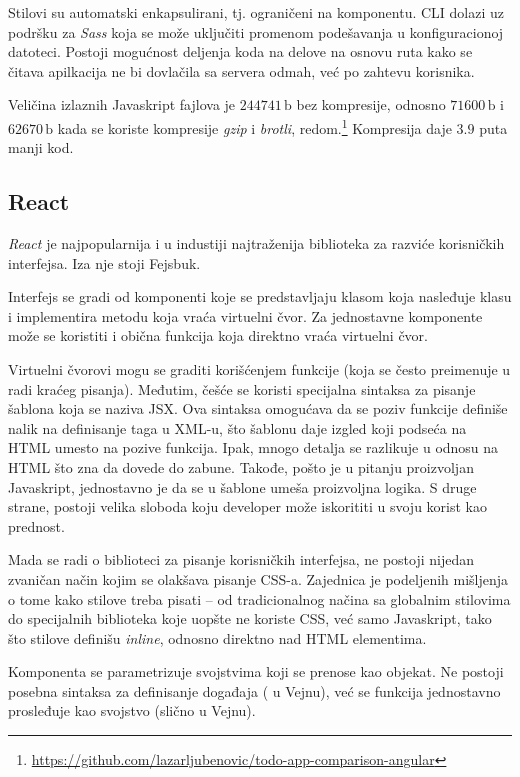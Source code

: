 Stilovi su automatski enkapsulirani, tj. ograničeni na komponentu.
CLI dolazi uz podršku za \textsl{Sass} koja se može uključiti promenom podešavanja u konfiguracionoj datoteci.
Postoji mogućnost deljenja koda na delove na osnovu ruta kako se čitava apilkacija ne bi dovlačila sa servera odmah, već po zahtevu korisnika.

Veličina izlaznih Javaskript fajlova je $244741\,\mathrm{b}$ bez kompresije, odnosno $71600\,\mathrm{b}$ i $62670\,\mathrm{b}$ kada se koriste kompresije \textsl{gzip} i \textsl{brotli}, redom.\footnote{\url{https://github.com/lazarljubenovic/todo-app-comparison-angular}} Kompresija daje $3.9$ puta manji kod.

\subsection{React}

\textsl{React} je najpopularnija i u industiji najtraženija biblioteka za razviće korisničkih interfejsa.
Iza nje stoji Fejsbuk.

Interfejs se gradi od komponenti koje se predstavljaju klasom koja nasleđuje klasu  i implementira metodu  koja vraća virtuelni čvor.
Za jednostavne komponente može se koristiti i obična funkcija koja direktno vraća virtuelni čvor.

Virtuelni čvorovi mogu se graditi korišćenjem funkcije  (koja se često preimenuje u  radi kraćeg pisanja).
Međutim, češće se koristi specijalna sintaksa za pisanje šablona koja se naziva JSX.
Ova sintaksa omogućava da se poziv funkcije definiše nalik na definisanje taga u XML-u, što šablonu daje izgled koji podseća na HTML umesto na pozive funkcija.
Ipak, mnogo detalja se razlikuje u odnosu na HTML što zna da dovede do zabune.
Takođe, pošto je u pitanju proizvoljan Javaskript, jednostavno je da se u šablone umeša proizvoljna logika.
S druge strane, postoji velika sloboda koju developer može iskorititi u svoju korist kao prednost.

Mada se radi o biblioteci za pisanje korisničkih interfejsa, ne postoji nijedan zvaničan način kojim se olakšava pisanje CSS-a.
Zajednica je podeljenih mišljenja o tome kako stilove treba pisati -- od tradicionalnog načina sa globalnim stilovima do specijalnih biblioteka koje uopšte ne koriste CSS, već samo Javaskript, tako što stilove definišu \textit{inline}, odnosno direktno nad HTML elementima.

Komponenta se parametrizuje svojstvima koji se prenose kao objekat.
Ne postoji posebna sintaksa za definisanje događaja ( u Vejnu), već se funkcija jednostavno prosleđuje kao svojstvo (slično  u Vejnu).

